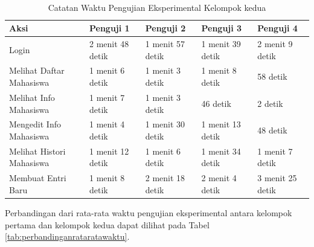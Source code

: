 \begin{center}
\begin{table}
\caption[Tabel 5-3 Catatan Waktu Pengujian Eksperimental Kelompok
Kedua]{Catatan Waktu Pengujian Eksperimental Kelompok kedua}\\
\label{tab:catatanwaktukelompokkedua}
\begin{center}
\begin{tabular}{|p{3cm}|p{1.5cm}|p{1.5cm}|p{1.5cm}|p{1.5cm}|}
\hline
Aksi & Penguji 1 & Penguji 2 & Penguji 3 & Penguji 4\\
\hline
Login & 2 menit 48 detik & 1 menit 57 detik & 1 menit 39 detik & 2 menit 9
detik\\
\hline
Melihat Daftar Mahasiswa & 1 menit 6 detik & 1 menit 3 detik & 1 menit 8 detik &
58 detik\\
\hline
Melihat Info Mahasiswa & 1 menit 7 detik & 1 menit 3 detik & 46 detik & 2
detik\\
\hline
Mengedit Info Mahasiswa & 1 menit 4 detik & 1 menit 30 detik & 1 menit 13 detik
& 48 detik\\
\hline
Melihat Histori Mahasiswa & 1 menit 12 detik & 1 menit 6 detik & 1 menit 34
detik & 1 menit 7 detik\\
\hline
Membuat Entri Baru & 1 menit 8 detik & 2 menit 18 detik & 2 menit 4 detik & 3
menit 25 detik\\
\hline
\end{tabular}
\end{center}
\end{table}
\end{center}

Perbandingan dari rata-rata waktu pengujian eksperimental antara kelompok
pertama dan kelompok kedua dapat dilihat pada Tabel
\ref{tab:perbandinganrataratawaktu}.

